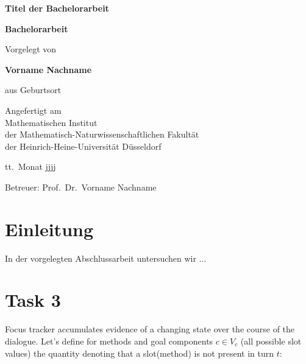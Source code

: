 \documentclass[12pt,titlepage,a4paper]{article}
\begin{document}
\begin{titlepage}
\begin{center}

\textbf{\LARGE Titel der Bachelorarbeit}

\bigskip\bigskip
\textbf{Bachelorarbeit}

\bigskip\bigskip\bigskip
Vorgelegt von

\bigskip
\textbf{Vorname Nachname}

\bigskip
aus Geburtsort


\vfill
Angefertigt am\\
Mathematischen Institut\\ 
der Mathematisch-Naturwissenschaftlichen Fakult\"at\\ 
der Heinrich-Heine-Universit\"at D\"usseldorf

\bigskip
tt.\ Monat jjjj

\bigskip
Betreuer: Prof.\ Dr.\ Vorname Nachname

\end{center}
\end{titlepage}

\thispagestyle{empty}\mbox{}\pagebreak
\setcounter{page}{0}

\tableofcontents
\pagebreak


\section*{Einleitung}

In der vorgelegten Abschlussarbeit untersuchen wir ...

\pagebreak

\section{Task 3}
Focus tracker accumulates evidence of a changing state over the course of the dialogue. Let's define for methods and goal components $c \in V_c$ (all possible slot values) the quantity denoting that a slot(method) is not present in turn $t$:
\end{document}
